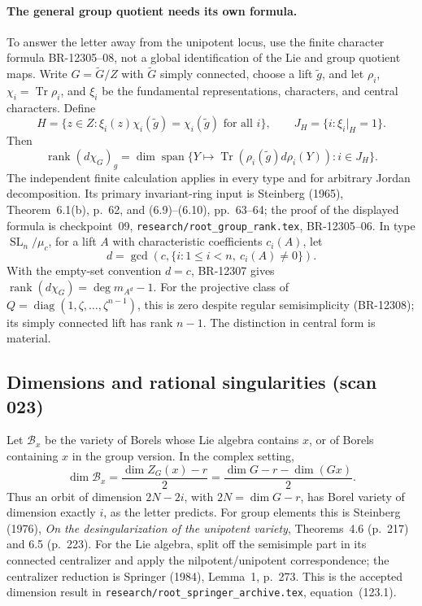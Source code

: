 \paragraph{The general group quotient needs its own formula.}
To answer the letter away from the unipotent locus, use the finite
character formula BR-12305--08, not a global identification of the
Lie and group quotient maps.  Write $G=\widetilde G/Z$ with
$\widetilde G$ simply connected, choose a lift $\widetilde g$, and
let $\rho_i$, $\chi_i=\operatorname{Tr}\rho_i$, and $\xi_i$
be the fundamental representations, characters, and central
characters.  Define
\[
 H=\{z\in Z:\xi_i(z)\chi_i(\widetilde g)=\chi_i(\widetilde g)
                   \text{ for all }i\},\qquad
 J_H=\{i:\xi_i|_H=1\}.
\]
Then
\[
 \operatorname{rank}(d\chi_G)_g=
 \dim\operatorname{span}\{Y\mapsto
 \operatorname{Tr}(\rho_i(\widetilde g)d\rho_i(Y)):i\in J_H\}.
\]
The independent finite calculation applies in every type and for
arbitrary Jordan decomposition.  Its primary invariant-ring input
is Steinberg (1965), Theorem~6.1(b), p.~62, and (6.9)--(6.10),
pp.~63--64; the proof of the displayed formula is checkpoint~09,
\texttt{research/root\_group\_rank.tex}, BR-12305--06.
In type $\operatorname{SL}_n/\mu_c$, for a lift $A$ with
characteristic coefficients $c_i(A)$, let
\[
 d=\gcd(c,\{i:1\leq i<n,\ c_i(A)\ne0\}).
\]
With the empty-set convention $d=c$, BR-12307 gives
$\operatorname{rank}(d\chi_G)=\deg m_{A^d}-1$.
For the projective class of
$Q=\operatorname{diag}(1,\zeta,\ldots,\zeta^{n-1})$, this is
zero despite regular semisimplicity (BR-12308); its simply connected
lift has rank $n-1$.  The distinction in central form is material.

\subsection{Dimensions and rational singularities (scan 023)}
Let $\mathcal B_x$ be the variety of Borels whose Lie algebra contains
$x$, or of Borels containing $x$ in the group version.  In the complex
setting,
\[
 \dim\mathcal B_x=\frac{\dim Z_G(x)-r}{2}
 =\frac{\dim G-r-\dim(Gx)}2.
\]
Thus an orbit of dimension $2N-2i$, with $2N=\dim G-r$, has
Borel variety of dimension exactly $i$, as the letter predicts.
For group elements this is Steinberg (1976),
\emph{On the desingularization of the unipotent variety},
Theorems~4.6 (p.~217) and 6.5 (p.~223).
For the Lie algebra, split off the semisimple part in its connected
centralizer and apply the nilpotent/unipotent correspondence; the
centralizer reduction is Springer (1984), Lemma~1, p.~273.
This is the accepted dimension result in
\texttt{research/root\_springer\_archive.tex}, equation~(123.1).

